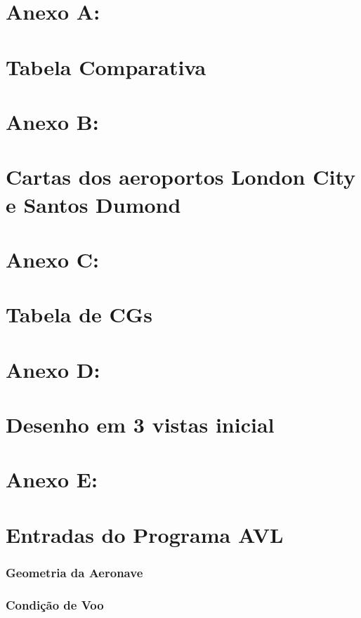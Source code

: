 \part*{Anexo A:\\~\\ Tabela Comparativa}
\label{anexoA}
  

\part*{Anexo B:\\~\\ Cartas dos aeroportos London City e Santos Dumond}
\label{anexoB}
  
  
  

\part*{Anexo C:\\~\\ Tabela de CGs}
\label{anexoC}
  

\part*{Anexo D:\\~\\ Desenho em 3 vistas inicial}
\label{anexoD}
  


\part*{Anexo E:\\~\\ Entradas do Programa AVL}
\label{anexoE}
\section*{Geometria da Aeronave}


\section*{Condição de Voo}

